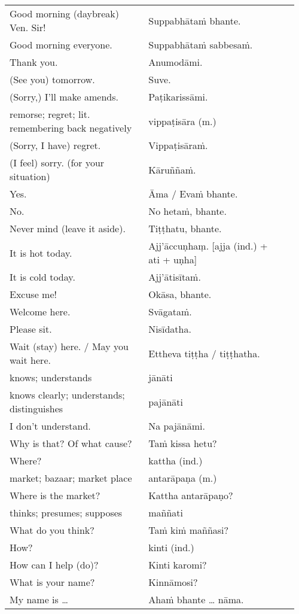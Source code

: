 \documentclass[a5paper]{memoir}
\begin{document}
\begin{longtable}{L{0.48\linewidth} L{0.48\linewidth} H}
Good morning (daybreak) Ven. Sir! & Suppabhātaṁ bhante. & \\[0pt]
Good morning everyone. & Suppabhātaṁ sabbesaṁ. & \\[0pt]
Thank you. & Anumodāmi. & \\[0pt]
(See you) tomorrow. & Suve. & \\[0pt]
(Sorry,) I'll make amends. & Paṭikarissāmi. & \\[0pt]
remorse; regret; lit. remembering back negatively & vippaṭisāra (m.) & \\[0pt]
(Sorry, I have) regret. & Vippaṭisāraṁ. & \\[0pt]
(I feel) sorry. (for your situation) & Kāruññaṁ. & \\[0pt]
Yes. & Āma / Evaṁ bhante. & \\[0pt]
No. & No hetaṁ, bhante. & \\[0pt]
Never mind (leave it aside). & Tiṭṭhatu, bhante. & \\[0pt]
It is hot today. & Ajj'āccuṇhaṃ. [ajja (ind.) + ati  + uṇha] & \\[0pt]
It is cold today. & Ajj'ātisītaṁ. & \\[0pt]
Excuse me! & Okāsa, bhante. & \\[0pt]
Welcome here. & Svāgataṁ. & \\[0pt]
Please sit. & Nisīdatha. & \\[0pt]
Wait (stay) here. / May you wait here. & Ettheva tiṭṭha / tiṭṭhatha. & \\[0pt]
knows; understands & jānāti & \\[0pt]
knows clearly; understands; distinguishes & pajānāti & \\[0pt]
I don't understand. & Na pajānāmi. & \\[0pt]
Why is that? Of what cause? & Taṁ kissa hetu? & \\[0pt]
Where? & kattha (ind.) & \\[0pt]
market; bazaar; market place & antarāpaṇa (m.) & \\[0pt]
Where is the market? & Kattha antarāpaṇo? & \\[0pt]
thinks; presumes; supposes & maññati & \\[0pt]
What do you think? & Taṁ kiṁ maññasi? & \\[0pt]
How? & kinti (ind.) & \\[0pt]
How can I help (do)? & Kinti karomi? & \\[0pt]
What is your name? & Kinnāmosi? & \\[0pt]
My name is \ldots{} & Ahaṁ bhante \ldots{} nāma. & \\[0pt]

\end{longtable}
\end{document}
